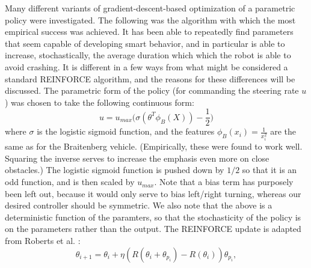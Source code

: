 \documentclass{article}
\begin{document}
Many different variants of gradient-descent-based optimization of a parametric policy were investigated.  The following was the algorithm with which the most empirical success was achieved.  It has been able to repeatedly find parameters that seem capable of developing smart behavior, and in particular is able to increase, stochastically, the average duration which which the robot is able to avoid crashing.  It is different in a few ways from what might be considered a standard REINFORCE algorithm, and the reasons for these differences will be discussed.  The parametric form of the policy (for commanding the steering rate $u$) was chosen to take the following continuous form: 
%
%
\begin{equation}
\label{u_continuous}
u = u_{max} \bigg(\sigma(\theta^T \phi_B(X)) - \frac{1}{2}\bigg) 
\end{equation}
%
%
where $\sigma$ is the logistic sigmoid function, and the features $\phi_B(x_i) = \frac{1}{x_i^2}$ are the same as for the Braitenberg vehicle.  (Empirically, these were found to work well.  Squaring the inverse serves to increase the emphasis even more on close obstacles.)  The logistic sigmoid function is pushed down by $1/2$ so that it is an odd function, and is then scaled by $u_{max}$.  Note that a bias term has purposely been left out, because it would only serve to bias left/right turning, whereas our desired controller should be symmetric.  We also note that the above is a deterministic function of the paramters, so that the stochasticity of the policy is on the parameters rather than the output.  The REINFORCE update is adapted from Roberts et al. \cite{Roberts11}:
%
%
\begin{equation}
\theta_{i+1} = \theta_i + \eta (R(\theta_i + \theta_{p_i}) - R(\theta_i)) \theta_{p_i},
\end{equation}
%
%
\end{document}
